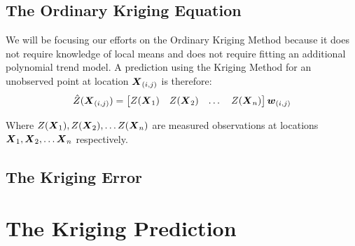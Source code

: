 \documentclass[11pt]{ucthesis}
\newcommand{\vect}[1]{{\it{\boldsymbol{#1}}}}
\begin{document}
\subsection{The Ordinary Kriging Equation}
We will be focusing our efforts on the Ordinary Kriging Method because it does not require knowledge of local means and does not require fitting an additional polynomial trend model. A prediction using the Kriging Method for an unobserved point at location $\vect{X}_{(i,j)}$ is therefore:
\begin{equation}
    \hat{Z}(\vect{X}_{(i,j)}) = \begin{bmatrix} Z(\vect{X}_1) & Z(\vect{X}_2) & \dots & Z(\vect{X}_n) \end{bmatrix}\vect{w}_{(i,j)}
    \label{eq:krigeq}
\end{equation}

Where $Z(\vect{X}_1), Z(\vect{X}_2), \dots Z(\vect{X}_n)$ are measured observations at locations $\vect{X}_1, \vect{X}_2, \dots \vect{X}_n$ respectively.
\subsection{The Kriging Error}

\section{The Kriging Prediction}
\end{document}
